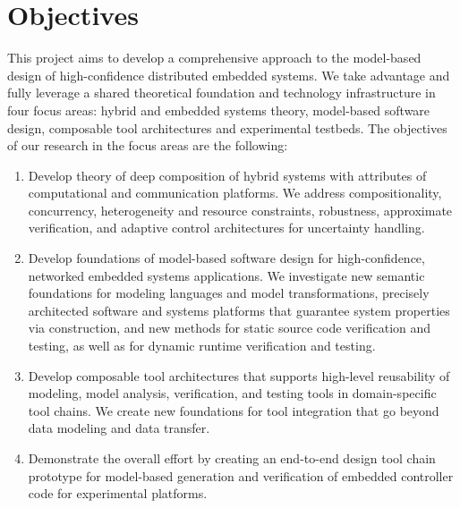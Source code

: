 

\section{Objectives}

This project aims to develop a comprehensive approach to the model-based design of high-confidence distributed embedded systems. We take advantage and fully leverage a shared theoretical foundation and technology infrastructure in four focus areas: hybrid and embedded systems theory, model-based software design, composable tool architectures and experimental testbeds. The objectives of our research in the focus areas are the following:   

\begin{enumerate}

\item Develop theory of deep composition of hybrid systems with attributes of computational and communication platforms. We address compositionality, concurrency, heterogeneity and resource constraints, robustness, approximate verification, and adaptive control architectures for uncertainty handling.

\item Develop foundations of model-based software design for high-confidence, networked embedded systems applications. We investigate new semantic foundations for modeling languages and model transformations, precisely architected software and systems platforms that guarantee system properties via construction, and new methods for static source code verification and testing, as well as for dynamic runtime verification and testing.

\item Develop composable tool architectures that supports high-level reusability of modeling, model analysis, verification, and testing tools in domain-specific tool chains. We create new foundations for tool integration that go beyond data modeling and data transfer.

\item Demonstrate the overall effort by creating an end-to-end design tool chain prototype for model-based generation and verification of embedded controller code for experimental platforms.

\end{enumerate}
